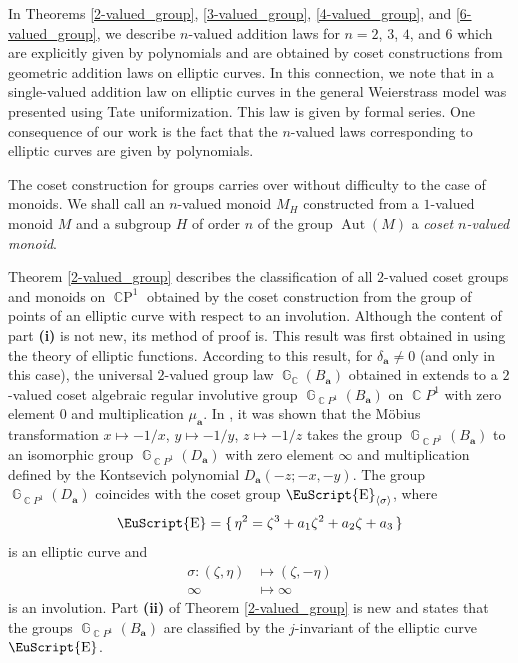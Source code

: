 \documentclass[14pt, dvipsnames]{extarticle}
\theoremstyle{plain}
\theoremstyle{definition}
\theoremstyle{remark}
\DeclareMathOperator{\E}{\EuScript{E}}
\DeclareMathOperator{\G}{\mathbb{G}}
\DeclareMathOperator{\Aut}{\mathrm{Aut}}
\DeclareMathOperator{\Cc}{\mathbb{C}}
\DeclareMathOperator{\CP}{\mathbb{C}P}
\begin{document}
In Theorems \ref{2-valued_group}, \ref{3-valued_group}, \ref{4-valued_group}, and \ref{6-valued_group}, we describe $n$-valued addition laws for $n=2$, $3$, $4$, and $6$ which are explicitly given by polynomials and are obtained by coset constructions from geometric addition laws on elliptic curves. In this connection, we note that in \cite{Bunkova_Buchstaber11} a single-valued addition law on elliptic curves in the general Weierstrass model was presented using Tate uniformization. This law is given by formal series. One consequence of our work is the fact that the $n$-valued laws corresponding to elliptic curves are given by polynomials.

The coset construction for groups {\normalfont \cite[Theorem 1]{Buchstaber}} carries over without difficulty to the case of monoids. We shall call an $n$-valued monoid $M_{H}$ constructed from a $1$-valued monoid $M$ and a subgroup $H$ of order $n$ of the group $\Aut(M)$ a {\it coset $n$-valued monoid}.  

Theorem \ref{2-valued_group} describes the classification of all $2$-valued coset groups and monoids on $\CP^1$ obtained by the coset construction from the group of points of an elliptic curve with respect to an involution. Although the content of part {\bf{(i)}} is not new, its method of proof is. This result was first obtained in \cite[Theorem 4.7]{Kontsevich_type_polynomials} using the theory of elliptic functions. According to this result, for $\delta_{\boldsymbol{a}}\neq 0$ (and only in this case), the universal $2$-valued group law $\G_{\Cc}(B_{\boldsymbol{a}})$ obtained in \cite[Theorem 6.3]{Buchstaber_Veselov19} extends to a $2$-valued coset algebraic regular involutive group $\G_{\Cc\!P^1}(B_{\boldsymbol{a}})$ on $\Cc\!P^1$ with zero element $0$ and multiplication $\mu_{\boldsymbol{a}}$. In \cite[Theorem 5.1]{Kontsevich_type_polynomials}, it was shown that the Möbius transformation $x\mapsto -1/x$, $y\mapsto -1/y$, $z\mapsto -1/z$ takes the group $\G_{\Cc\!P^1}(B_{\boldsymbol{a}})$ to an isomorphic group $\G_{\Cc\!P^1}(D_{\boldsymbol{a}})$ with zero element $\infty$ and multiplication defined by the Kontsevich polynomial $D_{\boldsymbol{a}}(-z; -x, -y)$. The group $\G_{\Cc\!P^1}(D_{\boldsymbol{a}})$ coincides with the coset group $\E_{\langle\sigma\rangle}$, where
\begin{equation}\label{E_cubic}
\E = \{\,\eta^2 = \zeta^3 + a_1\zeta^2 + a_2\zeta + a_3\,\}
\end{equation}
is an elliptic curve and
$$\begin{aligned}
\sigma: (\zeta, \eta)&\mapsto (\zeta, -\eta)\\
\infty&\mapsto\infty
\end{aligned}$$
is an involution. Part {\bf (ii)} of Theorem \ref{2-valued_group} is new and states that the groups $\G_{\Cc\!P^1}(B_{\boldsymbol{a}})$ are classified by the $j$-invariant of the elliptic curve $\E$.
\end{document}
